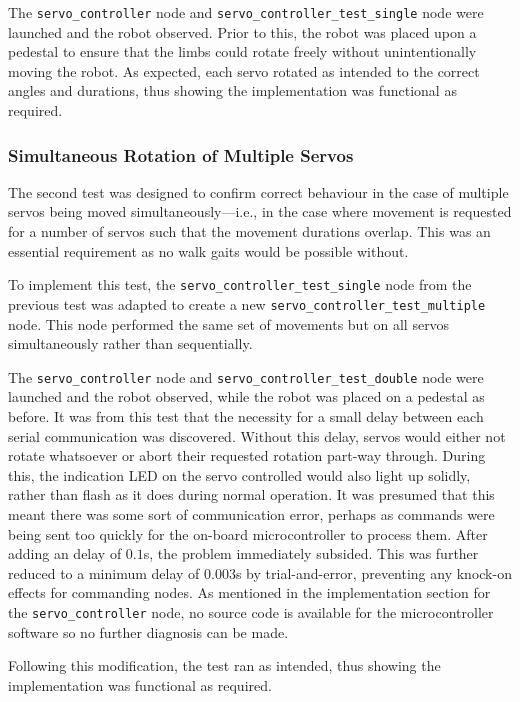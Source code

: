The \texttt{servo\_controller} node and \texttt{servo\_controller\_test\_single} node were launched and the robot observed. Prior to this, the robot was placed upon a pedestal to ensure that the limbs could rotate freely without unintentionally moving the robot. As expected, each servo rotated as intended to the correct angles and durations, thus showing the implementation was functional as required.

\subsubsection{Simultaneous Rotation of Multiple Servos}

The second test was designed to confirm correct behaviour in the case of multiple servos being moved simultaneously---i.e., in the case where movement is requested for a number of servos such that the movement durations overlap. This was an essential requirement as no walk gaits would be possible without.

To implement this test, the \texttt{servo\_controller\_test\_single} node from the previous test was adapted to create a new \texttt{servo\_controller\_test\_multiple} node. This node performed the same set of movements but on all servos simultaneously rather than sequentially.

The \texttt{servo\_controller} node and \texttt{servo\_controller\_test\_double} node were launched and the robot observed, while the robot was placed on a pedestal as before. It was from this test that the necessity for a small delay between each serial communication was discovered. Without this delay, servos would either not rotate whatsoever or abort their requested rotation part-way through. During this, the indication LED on the servo controlled would also light up solidly, rather than flash as it does during normal operation. It was presumed that this meant there was some sort of communication error, perhaps as commands were being sent too quickly for the on-board microcontroller to process them. After adding an delay of $0.1$s, the problem immediately subsided. This was further reduced to a minimum delay of $0.003$s by trial-and-error, preventing any knock-on effects for commanding nodes. As mentioned in the implementation section for the \texttt{servo\_controller} node, no source code is available for the microcontroller software so no further diagnosis can be made. 

Following this modification, the test ran as intended, thus showing the implementation was functional as required.

